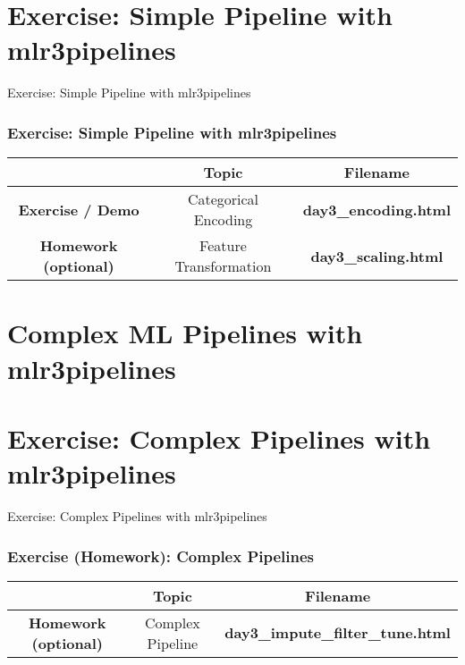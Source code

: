 \documentclass[13pt,compress]{beamer}
\begin{document}
\section{Exercise: Simple Pipeline with mlr3pipelines}
\begin{frame}{Exercise: Simple Pipeline with mlr3pipelines}
\frametitle{Exercise: Simple Pipeline with mlr3pipelines} \footnotesize \begin{tabular}{|c|c|c|} \hline & \textbf{Topic} & \textbf{Filename} \\ \hline \textbf{Exercise / Demo} & Categorical Encoding & \textbf{day3\_encoding.html} \\ \hline \textbf{Homework (optional)} & Feature Transformation & \textbf{day3\_scaling.html} \\ \hline \end{tabular} 
\end{frame}

\section{Complex ML Pipelines with mlr3pipelines}

\section{Exercise: Complex Pipelines with mlr3pipelines}
\begin{frame}{Exercise: Complex Pipelines with mlr3pipelines}
\frametitle{Exercise (Homework): Complex Pipelines} \footnotesize \begin{tabular}{|c|c|c|} \hline & \textbf{Topic} & \textbf{Filename} \\ \hline \textbf{Homework (optional)} & Complex Pipeline & \textbf{day3\_impute\_filter\_tune.html} \\ \hline \end{tabular} 
\end{frame}
\end{document}
